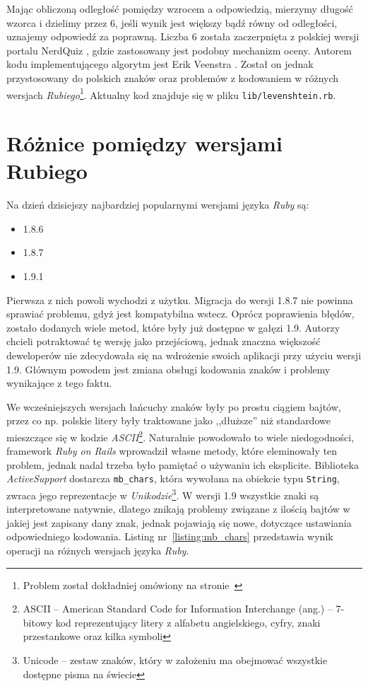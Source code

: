 \documentclass[12pt,twoside]{report}
\begin{document}
Mając obliczoną odległość pomiędzy wzrocem a odpowiedzią, mierzymy długość wzorca i
dzielimy przez 6, jeśli wynik jest większy bądź równy od odległości, uznajemy odpowiedź
za poprawną. Liczba 6 została zaczerpnięta z polskiej wersji portalu NerdQuiz \cite{nerdquiz},
gdzie zastosowany jest podobny mechanizm oceny. Autorem kodu implementującego algorytm jest
Erik Veenstra \cite{veenstra}. Został on jednak przystosowany do polskich znaków oraz
problemów z kodowaniem w różnych wersjach \emph{Rubiego}\footnote{Problem został dokładniej
omówiony na stronie~\pageref{sec:ruby-versions}}. Aktualny kod znajduje się w pliku
\texttt{lib/levenshtein.rb}.

\section{Różnice pomiędzy wersjami Rubiego}\label{sec:ruby-version}
Na dzień dzisiejszy najbardziej popularnymi wersjami języka \emph{Ruby} są:

\begin{itemize}
  \item{1.8.6}
  \item{1.8.7}
  \item{1.9.1}
\end{itemize}


Pierwsza z nich powoli wychodzi z użytku. Migracja do wersji 1.8.7 nie powinna sprawiać
problemu, gdyż jest kompatybilna wstecz. Oprócz poprawienia błędów, zostało dodanych wiele
metod, które były już dostępne w gałęzi 1.9. Autorzy chcieli potraktować tę wersję jako
przejściową, jednak znaczna większość deweloperów nie zdecydowała się na wdrożenie swoich
aplikacji przy użyciu wersji 1.9. Głównym powodem jest zmiana obsługi kodowania znaków i
problemy wynikające z tego faktu.


We wcześniejszych wersjach łańcuchy znaków były po prostu
ciągiem bajtów, przez co np. polskie litery były traktowane jako ,,dłuższe'' niż
standardowe mieszczące się w kodzie \emph{ASCII}\footnote{ASCII -- American Standard Code
for Information Interchange (ang.) -- 7-bitowy kod reprezentujący litery z alfabetu
angielskiego, cyfry, znaki przestankowe oraz kilka symboli}. Naturalnie powodowało to wiele
niedogodności, framework \emph{Ruby on Rails} wprowadził własne metody, które eleminowały
ten problem, jednak nadal trzeba było pamiętać o używaniu ich eksplicite. Biblioteka
\emph{ActiveSupport} dostarcza \texttt{mb\_chars}, która wywołana na obiekcie typu
\texttt{String}, zwraca jego reprezentacje w \emph{Unikodzie}\footnote{Unicode --
zestaw znaków, który w założeniu ma obejmować wszystkie dostępne pisma na świecie}. W
wersji 1.9 wszystkie znaki są interpretowane natywnie, dlatego znikają problemy związane z
ilością bajtów w jakiej jest zapisany dany znak, jednak pojawiają się nowe, dotyczące
ustawiania odpowiedniego kodowania. Listing nr~\ref{listing:mb_chars} przedstawia
wynik operacji na różnych wersjach języka \emph{Ruby}.
\end{document}

